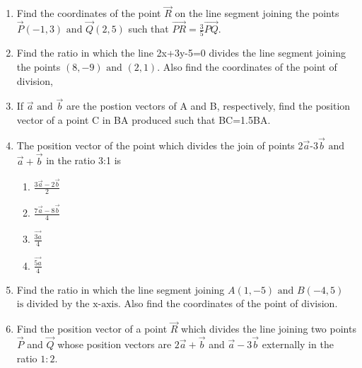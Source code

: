 \begin{enumerate}[label=\thesubsection.\arabic*,ref=\thesubsection.\theenumi]
\item Find the coordinates of the point $\vec{R}$ on the line segment joining the points $\vec{P}(-1,3)\text{ and }\vec{Q}(2,5)$ such that $\vec{PR}={\frac{3}{5}}\vec{PQ}$.
\item Find the ratio in which the line 2x+3y-5=0 divides the line segment joining the points $(8,-9)\text{ and }(2,1)$. Also find the coordinates of the point of division,
\item If $\vec{a}$ $\text{and}$ $\vec{b}$ are the postion vectors of A and B, respectively, find the position vector of a point C in BA produced such that BC=1.5BA.
\item The position vector of the point which divides the join of points 2$\vec{a}$-3$\vec{b}$ $\text{and}$ $\vec{a}+\vec{b}$ in the ratio 3:1 is
	\begin{enumerate}
\item $\frac{3\vec{a}-2\vec{b}}{2}$
\item $\frac{7\vec{a}-8\vec{b}}{4}$
\item $\frac{\vec{3a}}{4}$
\item $\frac{\vec{5a}}{4}$
\end{enumerate}
\item Find the ratio in which the line segment joining $A(1,-5) \text{ and } B(-4,5)$ $\text{is divided by the x-axis}$. Also find the coordinates of the point of division.
\item Find the position vector of a point $\vec{R}$ which divides the line joining two points $\vec{P}$ and $\vec{Q}$ whose position vectors are $2\vec{a}+\vec{b}$ and $\vec{a}-3\vec{b}$ externally in the ratio $1:2$.
\end{enumerate}

